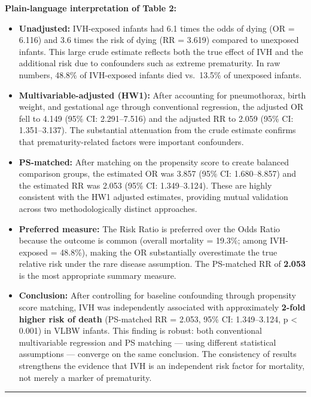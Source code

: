 \documentclass[
]{article}
\begin{document}
\textbf{Plain-language interpretation of Table 2:}

\begin{itemize}
\item
  \textbf{Unadjusted:} IVH-exposed infants had 6.1 times the odds of
  dying (OR = 6.116) and 3.6 times the risk of dying (RR = 3.619)
  compared to unexposed infants. This large crude estimate reflects both
  the true effect of IVH and the additional risk due to confounders such
  as extreme prematurity. In raw numbers, 48.8\% of IVH-exposed infants
  died vs.~13.5\% of unexposed infants.
\item
  \textbf{Multivariable-adjusted (HW1):} After accounting for
  pneumothorax, birth weight, and gestational age through conventional
  regression, the adjusted OR fell to 4.149 (95\% CI: 2.291--7.516) and
  the adjusted RR to 2.059 (95\% CI: 1.351--3.137). The substantial
  attenuation from the crude estimate confirms that prematurity-related
  factors were important confounders.
\item
  \textbf{PS-matched:} After matching on the propensity score to create
  balanced comparison groups, the estimated OR was 3.857 (95\% CI:
  1.680--8.857) and the estimated RR was 2.053 (95\% CI: 1.349--3.124).
  These are highly consistent with the HW1 adjusted estimates, providing
  mutual validation across two methodologically distinct approaches.
\item
  \textbf{Preferred measure:} The Risk Ratio is preferred over the Odds
  Ratio because the outcome is common (overall mortality = 19.3\%; among
  IVH-exposed = 48.8\%), making the OR substantially overestimate the
  true relative risk under the rare disease assumption. The PS-matched
  RR of \textbf{2.053} is the most appropriate summary measure.
\item
  \textbf{Conclusion:} After controlling for baseline confounding
  through propensity score matching, IVH was independently associated
  with approximately \textbf{2-fold higher risk of death} (PS-matched RR
  = 2.053, 95\% CI: 1.349--3.124, p \textless{} 0.001) in VLBW infants.
  This finding is robust: both conventional multivariable regression and
  PS matching --- using different statistical assumptions --- converge
  on the same conclusion. The consistency of results strengthens the
  evidence that IVH is an independent risk factor for mortality, not
  merely a marker of prematurity.
\end{itemize}

\begin{center}\rule{0.5\linewidth}{0.5pt}\end{center}
\end{document}
